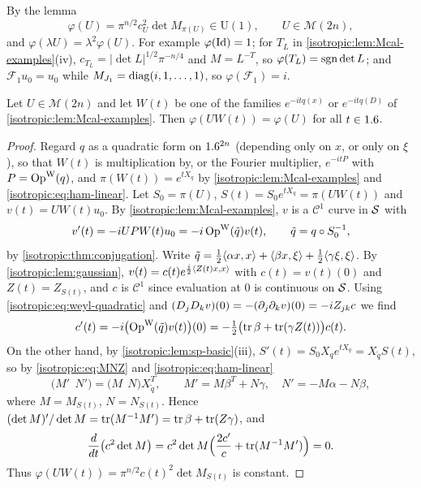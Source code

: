 By the lemma
\begin{equation}\label{isotropic:eq:phase}
  \varphi(U)=\pi^{n/2}c_U^2\det M_{\pi(U)}\in\mathrm U(1),\qquad U\in\mathcal M(2n),
\end{equation}
and $\varphi(\lambda U)=\lambda^2\varphi(U)$. For example
$\varphi(\operatorname{Id})=1$; for $T_L$ in \cref{isotropic:lem:Mcal-examples}(iv),
$c_{T_L}=|\det L|^{1/2}\pi^{-n/4}$ and $M=L^{-T}$, so
$\varphi(T_L)=\operatorname{sgn}\det L$; and $\mathcal F_1u_0=u_0$ while
$M_{J_1}=\operatorname{diag}(i,1,\dots,1)$, so $\varphi(\mathcal F_1)=i$.

\begin{lemma}\label{isotropic:lem:phase-invariance}
Let $U\in\mathcal M(2n)$ and let $W(t)$ be one of the families
$e^{-itq(x)}$ or $e^{-itq(D)}$ of \cref{isotropic:lem:Mcal-examples}. Then
$\varphi(UW(t))=\varphi(U)$ for all $t\in1.6$.
\end{lemma}
\begin{proof}
Regard $q$ as a quadratic form on $1.6^{2n}$ (depending only on $x$, or only on
$\xi$), so that $W(t)$ is multiplication by, or the Fourier multiplier,
$e^{-itP}$ with $P=\operatorname{Op}^{\mathrm{W}}(q)$, and $\pi(W(t))=e^{tX_q}$ by
\cref{isotropic:lem:Mcal-examples} and \eqref{isotropic:eq:ham-linear}. Let
$S_0=\pi(U)$, $S(t)=S_0e^{tX_q}=\pi(UW(t))$ and $v(t)=UW(t)u_0$. By
\cref{isotropic:lem:Mcal-examples}, $v$ is a $\mathcal C^1$ curve in $\mathcal{S}$ with
\begin{equation*}
  v'(t)=-iUPW(t)u_0=-i\operatorname{Op}^{\mathrm{W}}(\tilde q)v(t),\qquad\tilde q=q\circ S_0^{-1},
\end{equation*}
by \cref{isotropic:thm:conjugation}. Write
$\tilde q=\frac12\langle \alpha x, x\rangle+\langle \beta x, \xi\rangle+\frac12\langle \gamma\xi, \xi\rangle$.
By \cref{isotropic:lem:gaussian}, $v(t)=c(t)e^{\frac i2\langle Z(t)x, x\rangle}$ with
$c(t)=v(t)(0)$ and $Z(t)=Z_{S(t)}$, and $c$ is $\mathcal C^1$ since evaluation
at $0$ is continuous on $\mathcal{S}$. Using \eqref{isotropic:eq:weyl-quadratic} and
$(D_jD_kv)(0)=-(\partial_j\partial_kv)(0)=-iZ_{jk}c$ we find
\begin{equation*}
  c'(t)=-i\bigl(\operatorname{Op}^{\mathrm{W}}(\tilde q)v(t)\bigr)(0)=-\tfrac12\bigl(\operatorname{tr}\beta+\operatorname{tr}(\gamma Z(t))\bigr)c(t).
\end{equation*}
On the other hand, by \cref{isotropic:lem:sp-basic}(iii),
$S'(t)=S_0X_qe^{tX_q}=X_{\tilde q}S(t)$, so by \eqref{isotropic:eq:MNZ} and
\eqref{isotropic:eq:ham-linear}
\begin{equation}\label{isotropic:eq:MN-derivative}
  \bigl(M'\ \ N'\bigr)=\bigl(M\ \ N\bigr)X_{\tilde q}^T,\qquad
  M'=M\beta^T+N\gamma,\quad N'=-M\alpha-N\beta,
\end{equation}
where $M=M_{S(t)}$, $N=N_{S(t)}$. Hence
$(\det M)'/\det M=\operatorname{tr}(M^{-1}M')=\operatorname{tr}\beta+\operatorname{tr}(Z\gamma)$, and
\begin{equation*}
  \frac{d}{dt}\bigl(c^2\det M\bigr)=c^2\det M\Bigl(\frac{2c'}{c}+\operatorname{tr}(M^{-1}M')\Bigr)=0 .
\end{equation*}
Thus $\varphi(UW(t))=\pi^{n/2}c(t)^2\det M_{S(t)}$ is constant.
\end{proof}

